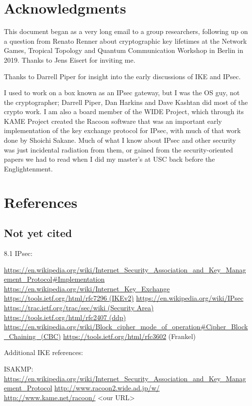\documentclass[%
 aip,
 jmp,%
 amsmath,amssymb,
 reprint,%
]{revtex4-1}
\begin{document}
\section*{Acknowledgments}

This document began as a very long email to a group researchers,
following up on a question from Renato Renner about cryptographic key
lifetimes at the Network Games, Tropical Topology and Quantum
Communication Workshop in Berlin in 2019.  Thanks to Jens Eisert for
inviting me.

Thanks to Darrell Piper for insight into the early discussions of IKE
and IPsec.

I used to work on a box known as an IPsec gateway, but I was the OS
guy, not the cryptographer; Darrell Piper, Dan Harkins and Dave
Kashtan did most of the crypto work.  I am also a board member of the
WIDE Project, which through its KAME Project created the Racoon
software that was an important early implementation of the key
exchange protocol for IPsec, with much of that work done by Shoichi
Sakane.  Much of what I know about IPsec and other security was just
incidental radiation from them, or gained from the security-oriented
papers we had to read when I did my master's at USC back before the
Englightenment.

\section{References}



\subsection{Not yet cited}

8.1 IPsec:

\url{https://en.wikipedia.org/wiki/Internet_Security_Association_and_Key_Management_Protocol#Implementation}
\url{https://en.wikipedia.org/wiki/Internet_Key_Exchange}
\url{https://tools.ietf.org/html/rfc7296 (IKEv2)}
\url{https://en.wikipedia.org/wiki/IPsec}
\url{https://trac.ietf.org/trac/sec/wiki (Security Area)}
\url{https://tools.ietf.org/html/rfc2407 (ddp)}
\url{https://en.wikipedia.org/wiki/Block_cipher_mode_of_operation#Cipher_Block_Chaining_(CBC)}
\url{https://tools.ietf.org/html/rfc3602} (Frankel)

Additional IKE references:

ISAKMP:
\url{https://en.wikipedia.org/wiki/Internet_Security_Association_and_Key_Management_Protocol}
\url{http://www.racoon2.wide.ad.jp/w/}
\url{http://www.kame.net/racoon/}
<our URL>
\end{document}
